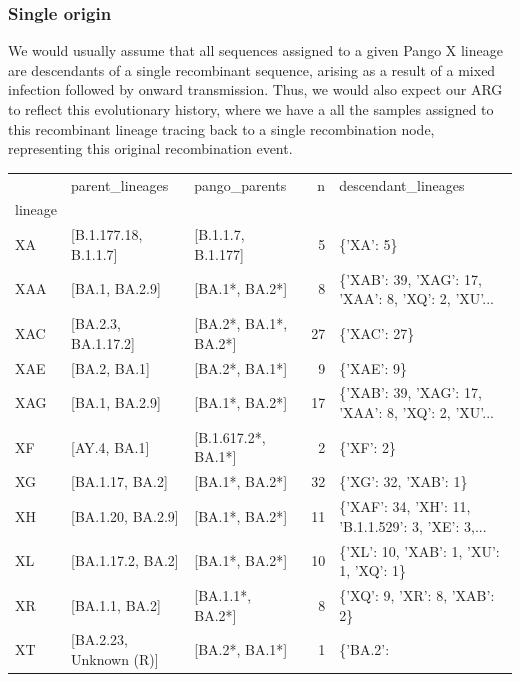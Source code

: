 \documentclass{article}
\begin{document}
\subsubsection{Single origin}

We would usually assume that all sequences assigned to a given Pango X
lineage are descendants of a single recombinant sequence, arising as a
result of a mixed infection followed by onward transmission. Thus, we
would also expect our ARG to reflect this evolutionary history, where
we have a all the samples assigned to this recombinant lineage tracing
back to a single recombination node, representing this original
recombination event.

\begin{table}
\begin{tabular}{lllrl}
\toprule
{} &         parent\_lineages &          pango\_parents &   n &
descendant\_lineages \\
lineage &                         &                        &     &
\\
\midrule
XA      &   [B.1.177.18, B.1.1.7] &     [B.1.1.7, B.1.177] &   5 & \{'XA': 5\} \\
XAA     &          [BA.1, BA.2.9] &         [BA.1*, BA.2*] &   8 &  \{'XAB':
39, 'XAG': 17, 'XAA': 8, 'XQ': 2, 'XU'... \\
XAC     &     [BA.2.3, BA.1.17.2] &  [BA.2*, BA.1*, BA.2*] &  27 &
\{'XAC': 27\} \\
XAE     &            [BA.2, BA.1] &         [BA.2*, BA.1*] &   9 &
\{'XAE': 9\} \\
XAG     &          [BA.1, BA.2.9] &         [BA.1*, BA.2*] &  17 &  \{'XAB':
39, 'XAG': 17, 'XAA': 8, 'XQ': 2, 'XU'... \\
XF      &            [AY.4, BA.1] &    [B.1.617.2*, BA.1*] &   2 &
\{'XF': 2\} \\
XG      &         [BA.1.17, BA.2] &         [BA.1*, BA.2*] &  32 &
\{'XG': 32, 'XAB': 1\} \\
XH      &       [BA.1.20, BA.2.9] &         [BA.1*, BA.2*] &  11 &  \{'XAF':
34, 'XH': 11, 'B.1.1.529': 3, 'XE': 3,... \\
XL      &       [BA.1.17.2, BA.2] &         [BA.1*, BA.2*] &  10 &
\{'XL': 10, 'XAB': 1, 'XU': 1, 'XQ': 1\} \\
XR      &          [BA.1.1, BA.2] &       [BA.1.1*, BA.2*] &   8 &
\{'XQ': 9, 'XR': 8, 'XAB': 2\} \\
XT      &  [BA.2.23, Unknown (R)] &         [BA.2*, BA.1*] &   1 &  \{'BA.2':

\end{tabular}
\end{table}
\end{document}
